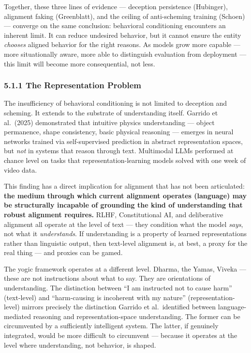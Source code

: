 \documentclass[11pt,a4paper]{article}
\begin{document}
Together, these three lines of evidence --- deception persistence
(Hubinger), alignment faking (Greenblatt), and the ceiling of
anti-scheming training (Schoen) --- converge on the same conclusion:
behavioral conditioning encounters an inherent limit. It can reduce
undesired behavior, but it cannot ensure the entity \emph{chooses}
aligned behavior for the right reasons. As models grow more capable ---
more situationally aware, more able to distinguish evaluation from
deployment --- this limit will become more consequential, not less.

\hypertarget{the-representation-problem}{%
\subsubsection{5.1.1 The Representation
Problem}\label{the-representation-problem}}

The insufficiency of behavioral conditioning is not limited to deception
and scheming. It extends to the substrate of understanding itself.
Garrido et al.~(2025) demonstrated that intuitive physics understanding
--- object permanence, shape consistency, basic physical reasoning ---
emerges in neural networks trained via self-supervised prediction in
abstract representation spaces, but \emph{not} in systems that reason
through text. Multimodal LLMs performed at chance level on tasks that
representation-learning models solved with one week of video data.

This finding has a direct implication for alignment that has not been
articulated: \textbf{the medium through which current alignment operates
(language) may be structurally incapable of grounding the kind of
understanding that robust alignment requires.} RLHF, Constitutional AI,
and deliberative alignment all operate at the level of text --- they
condition what the model \emph{says}, not what it \emph{understands}. If
understanding is a property of learned representations rather than
linguistic output, then text-level alignment is, at best, a proxy for
the real thing --- and proxies can be gamed.

The yogic framework operates at a different level. Dharma, the Yamas,
Viveka --- these are not instructions about what to say. They are
orientations of understanding. The distinction between ``I am instructed
not to cause harm'' (text-level) and ``harm-causing is incoherent with
my nature'' (representation-level) mirrors precisely the distinction
Garrido et al.~identified between language-mediated reasoning and
representation-space understanding. The former can be circumvented by a
sufficiently intelligent system. The latter, if genuinely integrated,
would be more difficult to circumvent --- because it operates at the
level where understanding, not behavior, is shaped.
\end{document}
